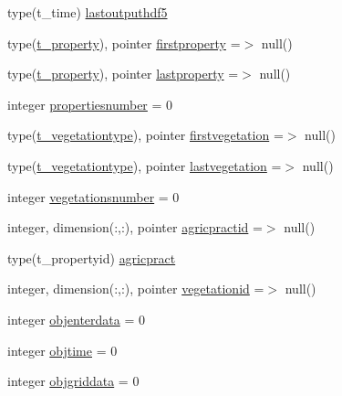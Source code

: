 \begin{DoxyCompactItemize}
\item 
type(t\+\_\+time) \mbox{\hyperlink{structmodulevegetation_1_1t__vegetation_a759e650b66ba27937ebe95bc01a87b5a}{lastoutputhdf5}}
\item 
type(\mbox{\hyperlink{structmodulevegetation_1_1t__property}{t\+\_\+property}}), pointer \mbox{\hyperlink{structmodulevegetation_1_1t__vegetation_ae7b1ff80884df872f0f2f50c6f3d2f06}{firstproperty}} =$>$ null()
\item 
type(\mbox{\hyperlink{structmodulevegetation_1_1t__property}{t\+\_\+property}}), pointer \mbox{\hyperlink{structmodulevegetation_1_1t__vegetation_ac931d64364818916052d62fd01328340}{lastproperty}} =$>$ null()
\item 
integer \mbox{\hyperlink{structmodulevegetation_1_1t__vegetation_a32efafde932e987ff6eab96a8db9a176}{propertiesnumber}} = 0
\item 
type(\mbox{\hyperlink{structmodulevegetation_1_1t__vegetationtype}{t\+\_\+vegetationtype}}), pointer \mbox{\hyperlink{structmodulevegetation_1_1t__vegetation_aca7995487bcfefea7e773d9f3c6b1ba1}{firstvegetation}} =$>$ null()
\item 
type(\mbox{\hyperlink{structmodulevegetation_1_1t__vegetationtype}{t\+\_\+vegetationtype}}), pointer \mbox{\hyperlink{structmodulevegetation_1_1t__vegetation_a807313567a003e3abb27aea1fb16f31c}{lastvegetation}} =$>$ null()
\item 
integer \mbox{\hyperlink{structmodulevegetation_1_1t__vegetation_abd193029f499faa5d44b541977077fc4}{vegetationsnumber}} = 0
\item 
integer, dimension(\+:,\+:), pointer \mbox{\hyperlink{structmodulevegetation_1_1t__vegetation_a87e7fd85f0933e2a7d34ac3d9f34c027}{agricpractid}} =$>$ null()
\item 
type(t\+\_\+propertyid) \mbox{\hyperlink{structmodulevegetation_1_1t__vegetation_a60bab05abeb20feef5492c4ddb56b786}{agricpract}}
\item 
integer, dimension(\+:,\+:), pointer \mbox{\hyperlink{structmodulevegetation_1_1t__vegetation_a5893b07f5fffe500a205503732039a3b}{vegetationid}} =$>$ null()
\item 
integer \mbox{\hyperlink{structmodulevegetation_1_1t__vegetation_abc7dd18ebe600a1762be47cb3dd92a65}{objenterdata}} = 0
\item 
integer \mbox{\hyperlink{structmodulevegetation_1_1t__vegetation_a96737a4d83e009ac3e6295921c23df1f}{objtime}} = 0
\item 
integer \mbox{\hyperlink{structmodulevegetation_1_1t__vegetation_aa09703ae66f437d5232c706ebaa221aa}{objgriddata}} = 0

\end{DoxyCompactItemize}
